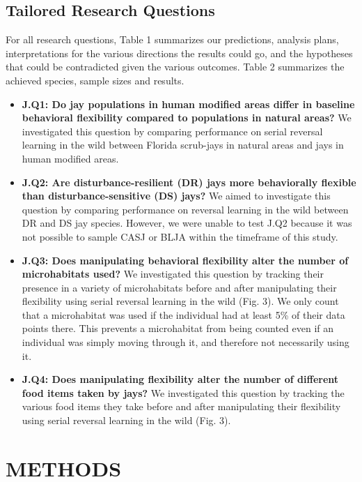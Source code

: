 \documentclass[
]{article}
\begin{document}
\newpage

\subsection{Tailored Research
Questions}\label{tailored-research-questions}

For all research questions, Table 1 summarizes our predictions, analysis
plans, interpretations for the various directions the results could go,
and the hypotheses that could be contradicted given the various
outcomes. Table 2 summarizes the achieved species, sample sizes and
results.

\begin{itemize}
\item
  \textbf{J.Q1: Do jay populations in human modified areas differ in
  baseline behavioral flexibility compared to populations in natural
  areas?} We investigated this question by comparing performance on
  serial reversal learning in the wild between Florida scrub-jays in
  natural areas and jays in human modified areas.
\item
  \textbf{J.Q2: Are disturbance-resilient (DR) jays more behaviorally
  flexible than disturbance-sensitive (DS) jays?} We aimed to
  investigate this question by comparing performance on reversal
  learning in the wild between DR and DS jay species. However, we were
  unable to test J.Q2 because it was not possible to sample CASJ or BLJA
  within the timeframe of this study.
\item
  \textbf{J.Q3: Does manipulating behavioral flexibility alter the
  number of microhabitats used?} We investigated this question by
  tracking their presence in a variety of microhabitats before and after
  manipulating their flexibility using serial reversal learning in the
  wild (Fig. 3). We only count that a microhabitat was used if the
  individual had at least 5\% of their data points there. This prevents
  a microhabitat from being counted even if an individual was simply
  moving through it, and therefore not necessarily using it.
\item
  \textbf{J.Q4: Does manipulating flexibility alter the number of
  different food items taken by jays?} We investigated this question by
  tracking the various food items they take before and after
  manipulating their flexibility using serial reversal learning in the
  wild (Fig. 3).
\end{itemize}

\section{\texorpdfstring{\textbf{METHODS}}{METHODS}}\label{methods}
\end{document}
